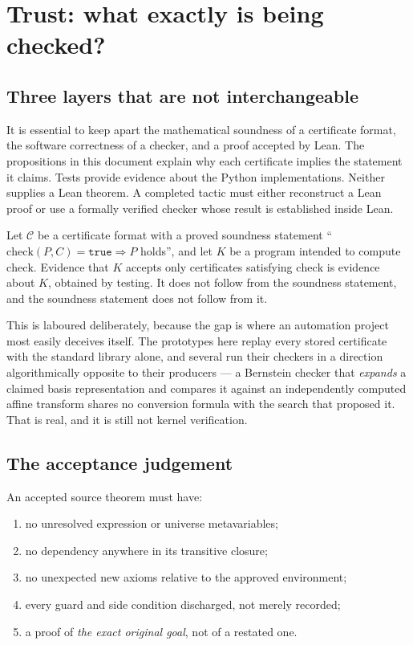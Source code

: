 \section{Trust: what exactly is being checked?}
\label{sec:trust}

\subsection{Three layers that are not interchangeable}

It is essential to keep apart the mathematical soundness of a certificate
format, the software correctness of a checker, and a proof accepted by Lean.
The propositions in this document explain why each certificate implies the
statement it claims. Tests provide evidence about the Python implementations.
Neither supplies a Lean theorem. A completed tactic must either reconstruct a
Lean proof or use a formally verified checker whose result is established
inside Lean.

\begin{proposition}
Let $\mathcal{C}$ be a certificate format with a proved soundness statement
``$\mathrm{check}(P,C)=\texttt{true}\Rightarrow P$ holds'', and let $K$ be a
program intended to compute $\mathrm{check}$. Evidence that $K$ accepts only
certificates satisfying $\mathrm{check}$ is evidence about $K$, obtained by
testing. It does not follow from the soundness statement, and the soundness
statement does not follow from it.
\end{proposition}

This is laboured deliberately, because the gap is where an automation project
most easily deceives itself. The prototypes here replay every stored
certificate with the standard library alone, and several run their checkers in
a direction algorithmically opposite to their producers --- a Bernstein checker
that \emph{expands} a claimed basis representation and compares it against an
independently computed affine transform shares no conversion formula with the
search that proposed it. That is real, and it is still not kernel verification.

\subsection{The acceptance judgement}

An accepted source theorem must have:

\begin{enumerate}[leftmargin=1.4em]
\item no unresolved expression or universe metavariables;
\item no  dependency anywhere in its transitive closure;
\item no unexpected new axioms relative to the approved environment;
\item every guard and side condition discharged, not merely recorded;
\item a proof of \emph{the exact original goal}, not of a restated one.
\end{enumerate}

